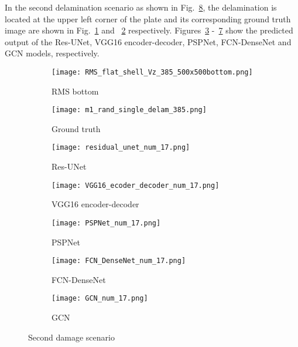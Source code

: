 \clearpage
In the second delamination scenario as shown in Fig.~\ref{fig:385_softmax}, the delamination is located at the upper left corner of the plate and its corresponding ground truth image are shown in Fig.~\ref{fig:RMS_flat_shell_Vz_385} and ~\ref{fig:m1_rand_single_delam_385} respectively. 
Figures~\ref{fig:Unet_Pred__softmax_385} -~\ref{fig:gcn_pred_385} show the predicted output of the Res-UNet, VGG16 encoder-decoder, PSPNet, FCN-DenseNet and GCN models, respectively. 
\begin{figure}[!h]
	\centering
	\begin{subfigure}[b]{0.47\textwidth}
		\centering
		\texttt{[image: RMS\_flat\_shell\_Vz\_385\_500x500bottom.png]}
		\caption{RMS bottom}
		\label{fig:RMS_flat_shell_Vz_385}
	\end{subfigure}
	\hfill
	\begin{subfigure}[b]{0.47\textwidth}
		\centering
		\texttt{[image: m1\_rand\_single\_delam\_385.png]}
		\caption{Ground truth}
		\label{fig:m1_rand_single_delam_385}
	\end{subfigure}
	\begin{subfigure}[b]{0.47\textwidth}
		\centering
		\texttt{[image: residual\_unet\_num\_17.png]}
		\caption{Res-UNet}
		\label{fig:Unet_Pred__softmax_385}
	\end{subfigure}
	\hfill
	\begin{subfigure}[b]{0.47\textwidth}
		\centering
		\texttt{[image: VGG16\_ecoder\_decoder\_num\_17.png]}
		\caption{VGG16 encoder-decoder}			\label{fig:vgg16_pred__softmax_385}			
	\end{subfigure}
	\hfill
	\begin{subfigure}[b]{0.47\textwidth}
		\centering
		\texttt{[image: PSPNet\_num\_17.png]}
		\caption{PSPNet}
		\label{fig:pspnet_pred__softmax_385}
	\end{subfigure}	
	\hfill
	\begin{subfigure}[b]{0.47\textwidth}
		\centering
		\texttt{[image: FCN\_DenseNet\_num\_17.png]}
		\caption{FCN-DenseNet}
		\label{fig:fcn_densenet_pred__softmax_385}
	\end{subfigure}	
	\hfill
	\begin{subfigure}[b]{0.47\textwidth}
		\centering
		\texttt{[image: GCN\_num\_17.png]}
		\caption{GCN}
		\label{fig:gcn_pred_385}
	\end{subfigure}
	\caption{Second damage scenario}
	\label{fig:385_softmax}
\end{figure}
